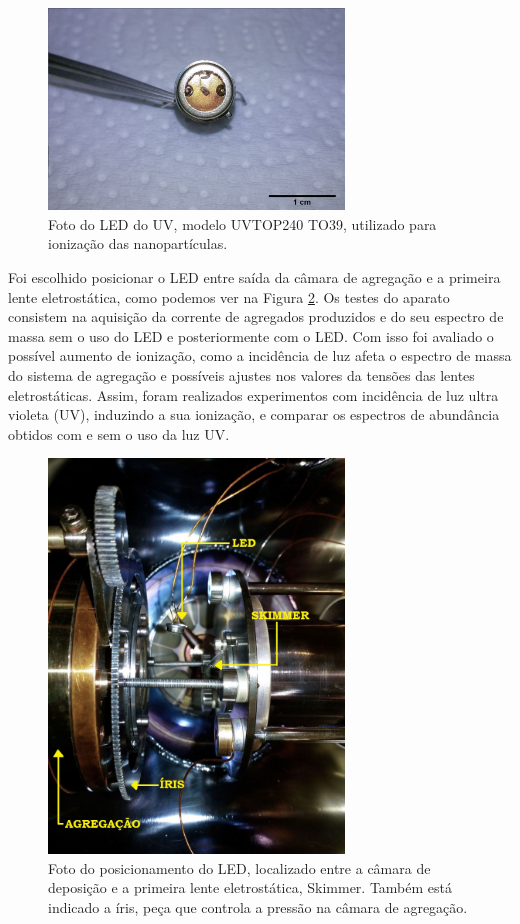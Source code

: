 \begin{figure}
  \centering
  \includegraphics[width=0.7\textwidth]{images/foca/led_scale}
  \caption{ Foto do LED do UV, modelo UVTOP240 TO39, utilizado para ionização das nanopartículas.  }
  \label{fig:foto_led}
\end{figure}


Foi escolhido posicionar o LED entre saída da câmara de agregação e a primeira lente eletrostática, como podemos ver na Figura \ref{fig:led_montagem}. Os testes do aparato consistem na aquisição da corrente de agregados produzidos e do seu espectro de massa sem o uso do LED e posteriormente com o LED. Com isso foi avaliado o possível aumento de ionização, como a incidência de luz afeta o espectro de massa do sistema de agregação e possíveis ajustes nos valores da tensões das lentes eletrostáticas.
Assim, foram realizados experimentos com incidência de luz ultra violeta (UV), induzindo a sua ionização, e comparar os espectros de abundância obtidos com e sem o uso da luz UV. 



\begin{figure}
  \centering
  \includegraphics[width=0.7\textwidth]{images/foca/led_montagem}
  \caption{Foto do posicionamento do LED, localizado entre a câmara de deposição e a primeira lente eletrostática, Skimmer. Também está indicado a íris, peça que controla a pressão na câmara de agregação.}
  \label{fig:led_montagem}
\end{figure}


